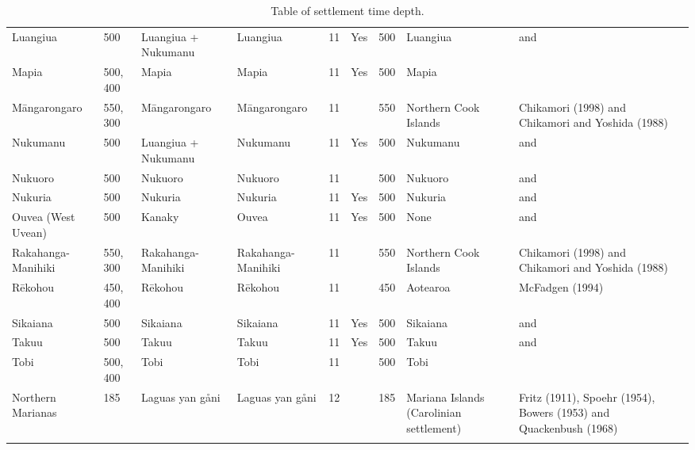 \begin{longtable}{p{2cm}p{2cm}p{2cm}p{2cm}p{2cm}p{2cm}p{2cm}p{2cm}p{2cm}p{2cm}}
  Luangiua & 500 & Luangiua + Nukumanu & Luangiua & 11 & Yes & 500 & Luangiua & \citet{kirch2012basline} and \citet{carson2012recent} &  \\ 
  Mapia & 500, 400 & Mapia & Mapia & 11 & Yes & 500 & Mapia & \citet{intoh2007reconnaissance} &  \\ 
  Māngarongaro & 550, 300 & Māngarongaro & Māngarongaro & 11 &  & 550 & Northern Cook Islands & Chikamori (1998) and Chikamori and Yoshida (1988) & \citet{rieth_cochrane_2018} \\ 
  Nukumanu & 500 & Luangiua + Nukumanu & Nukumanu & 11 & Yes & 500 & Nukumanu & \citet{kirch2012basline} and \citet{carson2012recent} &  \\ 
  Nukuoro & 500 & Nukuoro & Nukuoro & 11 &  & 500 & Nukuoro & \citet{kirch2012basline} and \citet{carson2012recent} &  \\ 
  Nukuria & 500 & Nukuria & Nukuria & 11 & Yes & 500 & Nukuria & \citet{kirch2012basline} and \citet{carson2012recent} &  \\ 
  Ouvea (West Uvean) & 500 & Kanaky & Ouvea & 11 & Yes & 500 & None & \citet{kirch2012basline} and \citet{carson2012recent} &  \\ 
  Rakahanga-Manihiki & 550, 300 & Rakahanga-Manihiki & Rakahanga-Manihiki & 11 &  & 550 & Northern Cook Islands & Chikamori (1998) and Chikamori and Yoshida (1988) & \citet{rieth_cochrane_2018} \\ 
  Rēkohou & 450, 400 & Rēkohou & Rēkohou & 11 &  & 450 & Aotearoa & McFadgen (1994) & \citet{rieth_cochrane_2018} \\ 
  Sikaiana & 500 & Sikaiana & Sikaiana & 11 & Yes & 500 & Sikaiana & \citet{kirch2012basline} and \citet{carson2012recent} &  \\ 
  Takuu & 500 & Takuu & Takuu & 11 & Yes & 500 & Takuu & \citet{kirch2012basline} and \citet{carson2012recent} &  \\ 
  Tobi & 500, 400 & Tobi & Tobi & 11 &  & 500 & Tobi & \citet{intoh2007reconnaissance} &  \\ 
  Northern Marianas & 185 & Laguas yan gåni & Laguas yan gåni & 12 &  & 185 & Mariana Islands (Carolinian settlement) & Fritz (1911), Spoehr (1954), Bowers (1953) and Quackenbush (1968) & \citet{ellis2012saipan} \\ 
   \bottomrule
\caption{Table of settlement time depth.} 
\label{appendix_dates_xtable}
\end{longtable}
